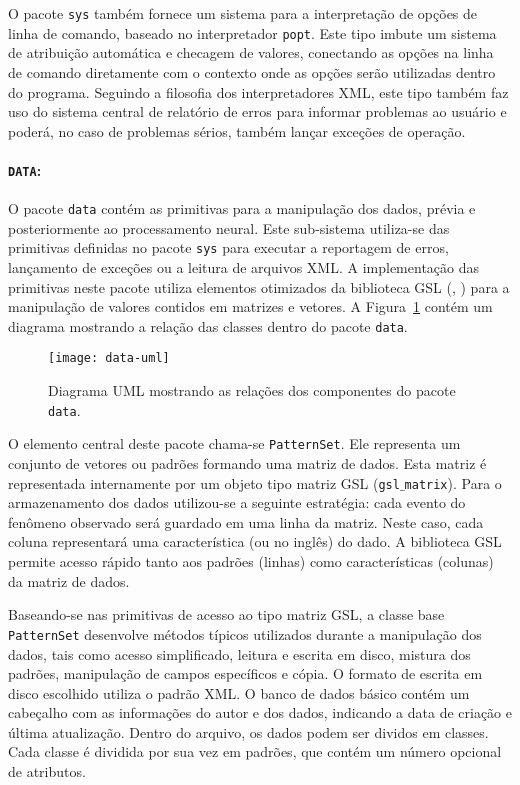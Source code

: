 O pacote \texttt{sys} também fornece um sistema para a interpretação de opções
de linha de comando, baseado no interpretador \texttt{popt}. Este tipo imbute
um sistema de atribuição automática e checagem de valores, conectando as
opções na linha de comando diretamente com o contexto onde as opções serão
utilizadas dentro do programa. Seguindo a filosofia dos interpretadores XML,
este tipo também faz uso do sistema central de relatório de erros para
informar problemas ao usuário e poderá, no caso de problemas sérios, também
lançar exceções de operação.

\paragraph{\texttt{DATA}:} O pacote \texttt{data} contém as primitivas para a
manipulação dos dados, prévia e posteriormente ao processamento neural. Este
sub-sistema utiliza-se das primitivas definidas no pacote \texttt{sys} para
executar a reportagem de erros, lançamento de exceções ou a leitura de
arquivos XML. A implementação das primitivas neste pacote utiliza elementos
otimizados da biblioteca GSL (, \cite{gsl}) para a
manipulação de valores contidos em matrizes e vetores. A
Figura~\ref{fig:data-uml} contém um diagrama mostrando a relação das classes
dentro do pacote \texttt{data}.

\begin{figure}
\begin{center}
\texttt{[image: data-uml]}
\end{center}
\caption{Diagrama UML mostrando as relações dos componentes do pacote
\texttt{data}.}
\label{fig:data-uml}
\end{figure}

O elemento central deste pacote chama-se \texttt{PatternSet}. Ele representa
um conjunto de vetores ou padrões formando uma matriz de dados. Esta matriz é
representada internamente por um objeto tipo matriz GSL
(\texttt{gsl$\_$matrix}). Para o armazenamento dos dados utilizou-se a seguinte
estratégia: cada evento do fenômeno observado será guardado em uma linha da
matriz. Neste caso, cada coluna representará uma característica (ou
 no inglês) do dado. A biblioteca GSL permite acesso rápido tanto
aos padrões (linhas) como características (colunas) da matriz de dados. 

Baseando-se nas primitivas de acesso ao tipo matriz GSL, a classe base
\texttt{PatternSet} desenvolve mé\-todos tí\-picos utilizados durante a
manipulação dos dados, tais como acesso simplificado, leitura e escrita em
disco, mistura dos padrões, manipulação de campos específicos e cópia. O
formato de escrita em disco escolhido utiliza o padrão XML. O banco de dados
básico contém um cabeçalho com as informações do autor e dos dados, indicando
a data de criação e última atualização. Dentro do arquivo, os dados podem ser
dividos em classes. Cada classe é dividida por sua vez em padrões, que contém
um número opcional de atributos.

